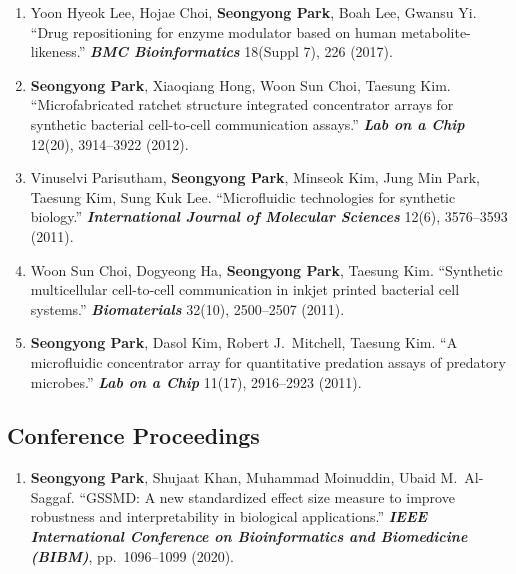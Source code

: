 \begin{scriptsize}
\begin{enumerate}
    \item Yoon Hyeok Lee, Hojae Choi, \textbf{Seongyong Park}, Boah Lee, Gwansu Yi. ``Drug repositioning for enzyme modulator based on human metabolite-likeness.'' \textit{\textbf{BMC Bioinformatics}} 18(Suppl 7), 226 (2017).

    \item \textbf{Seongyong Park}, Xiaoqiang Hong, Woon Sun Choi, Taesung Kim. ``Microfabricated ratchet structure integrated concentrator arrays for synthetic bacterial cell-to-cell communication assays.'' \textit{\textbf{Lab on a Chip}} 12(20), 3914--3922 (2012).

    \item Vinuselvi Parisutham, \textbf{Seongyong Park}, Minseok Kim, Jung Min Park, Taesung Kim, Sung Kuk Lee. ``Microfluidic technologies for synthetic biology.'' \textit{\textbf{International Journal of Molecular Sciences}} 12(6), 3576--3593 (2011).

    \item Woon Sun Choi, Dogyeong Ha, \textbf{Seongyong Park}, Taesung Kim. ``Synthetic multicellular cell-to-cell communication in inkjet printed bacterial cell systems.'' \textit{\textbf{Biomaterials}} 32(10), 2500--2507 (2011).

    \item \textbf{Seongyong Park}, Dasol Kim, Robert J.\ Mitchell, Taesung Kim. ``A microfluidic concentrator array for quantitative predation assays of predatory microbes.'' \textit{\textbf{Lab on a Chip}} 11(17), 2916--2923 (2011).

\end{enumerate}

\subsection*{Conference Proceedings}
\begin{enumerate}
    \item \textbf{Seongyong Park}, Shujaat Khan, Muhammad Moinuddin, Ubaid M.\ Al-Saggaf. ``GSSMD: A new standardized effect size measure to improve robustness and interpretability in biological applications.'' \textit{\textbf{IEEE International Conference on Bioinformatics and Biomedicine (BIBM)}}, pp.\ 1096--1099 (2020).
\end{enumerate}


\end{scriptsize}
